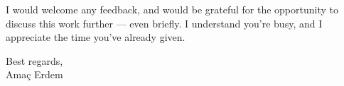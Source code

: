 \documentclass[11pt]{article}
\begin{document}
\bigskip
\noindent I would welcome any feedback, and would be grateful for the opportunity to discuss this work further --- even briefly. I understand you're busy, and I appreciate the time you've already given.

\bigskip
\noindent Best regards,\\
Ama\c{c} Erdem

\small


\end{document}
